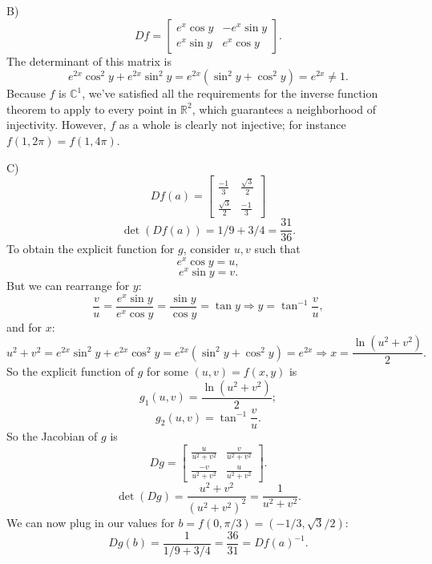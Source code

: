 \documentclass[12pt,leqno]{article}
\begin{document}
\indent B) 
$$Df = \begin{bmatrix}
	e^x \cos y & -e^x \sin y \\
	e^x \sin y & e^x \cos y
\end{bmatrix}.$$
The determinant of this matrix is
$$e^{2x} \cos^2y + e^{2x} \sin^2y = e^{2x}(\sin^2y + \cos^2y) = e^{2x} \neq 1.$$
Because $f$ is $\mathds{C}^1$, we've satisfied all the requirements for the inverse function theorem to apply to every point in $\mathds{R}^2$, which guarantees a neighborhood of injectivity. However, $f$ as a whole is clearly not injective; for instance $f(1, 2\pi) = f(1, 4\pi)$. 

\indent C)
$$Df(a) = \begin{bmatrix}
	\frac{-1}{3} & \frac{\sqrt{3}}{2} \\
	\frac{\sqrt{3}}{2} & \frac{-1}{3}
\end{bmatrix}$$
$$\det(Df(a)) = 1/9 + 3/4 = \frac{31}{36}.$$
To obtain the explicit function for $g$, consider $u, v$ such that 
$$e^x \cos y = u,$$
$$e^x \sin y = v.$$
But we can rearrange for $y$:
$$\frac{v}{u} = \frac{e^x \sin y}{e^x \cos y} = \frac{\sin y}{\cos y} = \tan y \Rightarrow y = \tan^{-1} \frac{v}{u},$$
and for $x$:
$$u^2 + v^2 = e^{2x} \sin^2 y + e^{2x} \cos^2 y = e^{2x}(\sin^2 y + \cos^2 y) = e^{2x} \Rightarrow x = \frac{\ln(u^2 + v^2)}{2}.$$ 
So the explicit function of $g$ for some $(u, v) = f(x,y)$ is 
$$g_1 (u, v) = \frac{\ln(u^2 + v^2)}{2};$$
$$g_2 (u, v) = \tan^{-1} \frac{v}{u}.$$
So the Jacobian of $g$ is
$$Dg = \begin{bmatrix}
	\frac{u}{u^2 + v^2} & \frac{v}{u^2 + v^2} \\
	\frac{-v}{u^2 + v^2} & \frac{u}{u^2 + v^2}
\end{bmatrix}.$$
$$\det(Dg) = \frac{u^2 + v^2}{(u^2 + v^2)^2} = \frac{1}{u^2 + v^2}.$$
We can now plug in our values for $b = f(0, \pi/3) = (-1/3, \sqrt{3}/2)$:
$$Dg(b) = \frac{1}{1/9 + 3/4} = \frac{36}{31} = Df(a)^{-1}.$$
\end{document}
